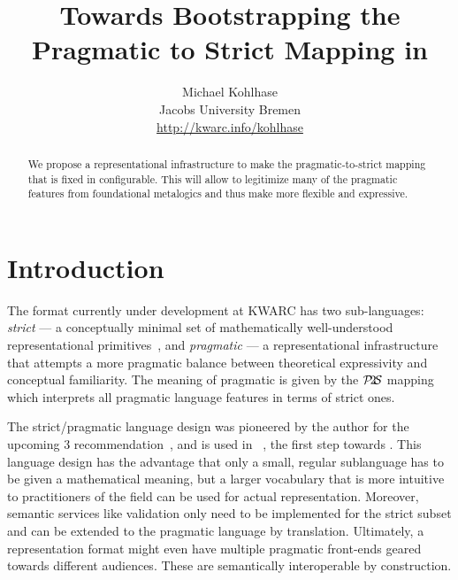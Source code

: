 \documentclass{article}
\title{Towards Bootstrapping the Pragmatic to Strict Mapping in {\omdoc}}
\author{Michael Kohlhase\\Jacobs University Bremen\\\url{http://kwarc.info/kohlhase}}
\def\ptos{\ensuremath{\mathcal{P}\kern-.2em2\kern-.2em\mathcal{S}}}
\begin{document}
\maketitle
\begin{abstract}
  We propose a representational infrastructure to make the {} pragmatic-to-strict
  mapping that is fixed in {} configurable. This will allow to legitimize many
  of the pragmatic {\omdoc} features from foundational metalogics and thus make {}
  more flexible and expressive.
\end{abstract}

\section{Introduction}\label{sec:intro}

The {} format currently under development at KWARC has two sub-languages:
{\emph{strict {\omdoc}}} --- a conceptually minimal set of mathematically well-understood
representational primitives~\cite{RabKoh:WSMSML09}, and {\emph{pragmatic}} {\omdoc} --- a
representational infrastructure that attempts a more pragmatic balance between theoretical
expressivity and conceptual familiarity. The meaning of pragmatic {\omdoc} is given by the
{\ptos} mapping which interprets all pragmatic language features in terms of strict ones.

The strict/pragmatic language design was pioneered by the author for the upcoming
{\mathml}3 recommendation~\cite{CarlisleEd:MathML09}, and is used in
{}~\cite{Kohlhase:OMDoc1.6spec}, the first step towards {}. This
language design has the advantage that only a small, regular sublanguage has to be given a
mathematical meaning, but a larger vocabulary that is more intuitive to practitioners of
the field can be used for actual representation. Moreover, semantic services like
validation only need to be implemented for the strict subset and can be extended to the
pragmatic language by translation. Ultimately, a representation format might even have
multiple pragmatic front-ends geared towards different audiences. These are semantically
interoperable by construction.
\end{document}
